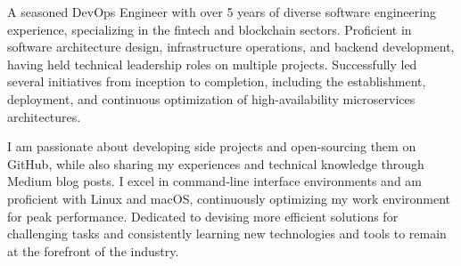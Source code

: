 

\begin{cvparagraph}

A seasoned DevOps Engineer with over 5 years of diverse software engineering experience, specializing in the fintech and blockchain sectors. Proficient in software architecture design, infrastructure operations, and backend development, having held technical leadership roles on multiple projects. Successfully led several initiatives from inception to completion, including the establishment, deployment, and continuous optimization of high-availability microservices architectures.

I am passionate about developing side projects and open-sourcing them on GitHub, while also sharing my experiences and technical knowledge through Medium blog posts. I excel in command-line interface environments and am proficient with Linux and macOS, continuously optimizing my work environment for peak performance. Dedicated to devising more efficient solutions for challenging tasks and consistently learning new technologies and tools to remain at the forefront of the industry.
\end{cvparagraph}
